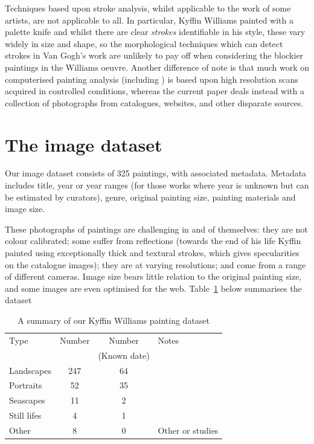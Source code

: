 \documentclass[conference,a4paper]{IEEEtran}
\begin{document}
Techniques based upon stroke analysis, whilst applicable to the work of some
artists, are not applicable to all. In particular, Kyffin Williams painted with
a palette knife and whilst there are clear \emph{strokes} identifiable in
his style, these vary widely in size and shape, so the morphological techniques
which can detect strokes in Van Gogh's work are unlikely to pay off when
considering the blockier paintings in the Williams oeuvre. Another difference
of note is that much work on computerised painting analysis (including
\cite{Li2012Rhythmic, Berezhnoy2009Automatic}) is based upon high resolution
scans acquired in controlled conditions, whereas the current paper deals
instead with a collection of photographs from catalogues, websites, and other
disparate sources. 

\section{The image dataset}

Our image dataset consists of 325 paintings, with associated metadata. Metadata
includes title, year or year ranges (for those works where year is unknown but
can be estimated by curators), genre, original painting size, painting
materials and image size.

These photographs of paintings are challenging in and of themselves: they are
not colour calibrated; some suffer from reflections (towards the end of his
life Kyffin painted using exceptionally thick and textural strokes, which gives
specularities on the catalogue images); they are at varying resolutions; and
come from a range of different cameras. Image size bears little relation to the
original painting size, and some images are even optimised for the web.
Table~\ref{summary_t} below summarises the dataset

\begin{table}[h]
\centering
\begin{tabular}{| l | c | c | p{3cm} |}
\hline
Type & Number & Number & Notes \\
  & & (Known date) &  \\
\hline
Landscapes  & 247 & 64 & \\
Portraits   &  52 & 35 & \\
Seascapes   &  11 &  2 & \\
Still lifes &   4 &  1 & \\
Other       &   8 &  0 & Other or studies \\
\hline
\end{tabular}
\vspace{0.5em}
\caption{A summary of our Kyffin Williams painting dataset}
\label{summary_t}
\end{table}
\end{document}
